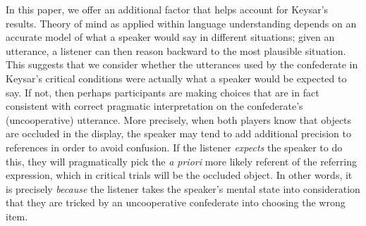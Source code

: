 \documentclass[10pt,letterpaper]{article}
\begin{document}
In this paper, we offer an additional factor that helps account for Keysar's results. 
Theory of mind as applied within language understanding depends on an accurate model of what a speaker would say in different situations; given an utterance, a listener can then reason backward to the most plausible situation.
This suggests that we consider whether the utterances used by the confederate in Keysar's critical conditions were actually what a speaker would be expected to say. 
If not, then perhaps participants are making choices that are in fact consistent with correct pragmatic interpretation on the confederate's (uncooperative) utterance.
More precisely, when both players know that objects are occluded in the display, the speaker may tend to add additional precision to references in order to avoid confusion. If the listener \emph{expects} the speaker to do this, they will pragmatically pick the \emph{a priori} more likely referent of the referring expression, which in critical trials will be the occluded object. In other words, it is precisely \emph{because} the listener takes the speaker's mental state into consideration that they are tricked by an uncooperative confederate into choosing the wrong item. 
\end{document}
